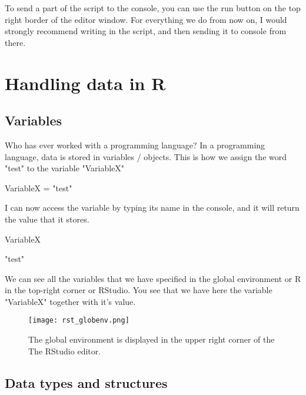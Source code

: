 \documentclass[a4paper,twoside]{tufte-book}\usepackage[]{graphicx}\usepackage[]{color}
\begin{document}
{\begin{appendices}
To send a part of the script to the console, you can use the run button on the top right border of the editor window. For everything we do from now on, I would strongly recommend writing in the script, and then sending it to console from there. 

\chapter{Handling data in R}
\label{HandlingDataInR}

\section{Variables}

Who has ever worked with a programming language? In a programming language, data is stored in variables / objects. This is how we assign the word "test" to the variable "VariableX"

\begin{Schunk}
\begin{Sinput}
VariableX = "test"
\end{Sinput}
\end{Schunk}

I can now access the variable by typing its name in the console, and it will return the value that it stores.
\begin{Schunk}
\begin{Sinput}
VariableX
\end{Sinput}
\begin{Soutput}
[1] "test"
\end{Soutput}
\end{Schunk}

We can see all the variables that we have specified in the global environment or R in the top-right corner or RStudio. You see that we have here the variable "VariableX" together with it's value. 


\begin{figure}[]
\begin{center}
\texttt{[image: rst\_globenv.png]}
\caption{The global environment is displayed in the upper right corner of the The RStudio editor.}
\label{fig: Rstudio}
\end{center}
\end{figure}

\section{Data types and structures}


\end{appendices}}
\end{document}
